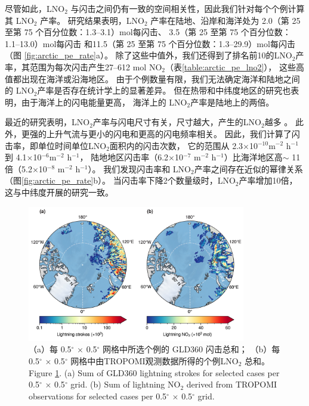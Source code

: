 尽管如此，LNO$_2$ 与闪击之间仍有一致的空间相关性，因此我们针对每个个例计算其 LNO$_2$ 产率。
研究结果表明，LNO$_2$ 产率在陆地、沿岸和海洋处为 2.0（第 25 至第 75 个百分位数：1.3--3.1）mol每闪击、
3.5（第 25 至第 75 个百分位数：1.1--13.0）mol每闪击
和11.5（第 25 至第 75 个百分位数：1.3--29.9）mol每闪击（图 \ref{fig:arctic_pe_rate}a）。
除了这些中值外，我们还得到了排名前10的LNO$_2$产率，其范围为每次闪击产生27--612 mol NO$_2$（表\ref{table:arctic_pe_lno2}），
这些高值都出现在海洋或沿海地区。
由于个例数量有限，我们无法确定海洋和陆地之间的 LNO$_2$产率是否存在统计学上的显著差异。
但在热带和中纬度地区的研究也表明，由于海洋上的闪电能量更高\citep{Beirle.2014,Hutchins.2013}，
海洋上的 LNO$_2$产率是陆地上的两倍\citep{Marais.2018,Allen.2019,Bucsela.2019}。

最近的研究表明，LNO$_2$产率与闪电尺寸有关，尺寸越大，产生的LNO$_2$越多 \citep{Huntrieser.2008,Marais.2018}。
此外，更强的上升气流与更小的闪电和更高的闪电频率相关\citep{Bruning.2013,Bruning.2015,Mecikalski.2015}。
因此，我们计算了闪击率，即单位时间单位LNO$_2$面积内的闪击次数，
它的范围从 2.3$\times$10$^{-10} $m$^{-2}$ h$^{-1}$ 到 4.1$\times$10$^{-6} $m$^{-2 }$ h$^{-1}$，
陆地地区闪击率（6.2$\times$10$^{-7}$ m$^{-2}$ h$^{-1}$）比海洋地区高$\sim$ 11 倍（5.2$\times$10$^{-8}$ m$^{-2}$ h$^{-1}$）。
我们发现闪击率和 LNO$_2$产率之间存在近似的幂律关系（图\ref{fig:arctic_pe_rate}b）。
当闪击率下降2个数量级时，LNO$_2$产率增加10倍，这与中纬度开展的研究一致\citep{Bucsela.2019,Zhang.2020b}。


\begin{figure}[H]
\centering
\includegraphics[width=0.85\textwidth]{./figures/arctic_lno2_production.png}
\caption{
（a）每 0.5$^{\circ}$ $\times$ 0.5$^{\circ}$ 网格中所选个例的 GLD360 闪击总和；
（b）每 0.5$^{\circ}$ $\times$ 0.5$^{\circ}$ 网格中由TROPOMI观测数据所得的个例LNO$_2$ 总和。\\
Figure \ref{fig:arctic_lno2_production}. (a) Sum of GLD360 lightning strokes for selected cases per 0.5$^{\circ}$ $\times$ 0.5$^{\circ}$ grid.
(b) Sum of lightning NO$_2$ derived from TROPOMI observations for selected cases per 0.5$^{\circ}$ $\times$ 0.5$^{\circ}$ grid.
}
\label{fig:arctic_lno2_production}
\end{figure}

